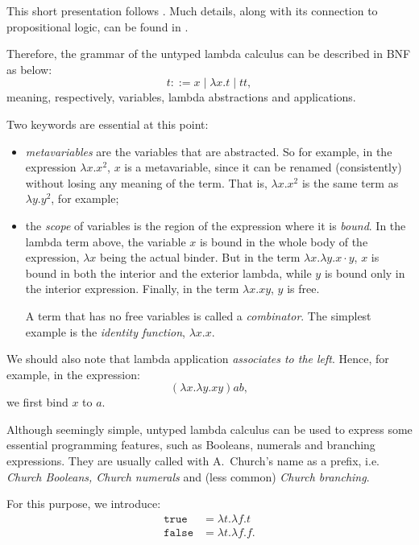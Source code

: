 This short presentation follows \cite[\S5]{tapl}. Much details, along
with its connection to propositional logic, can be found in
\cite{ch}.

Therefore, the grammar of the untyped lambda calculus can be described
in BNF as below:
\[
  t ::= x \mid \lambda x . t \mid t t,
\]
meaning, respectively, variables, lambda abstractions and applications.

Two keywords are essential at this point:
\begin{itemize}
\item \emph{metavariables} are the variables that are abstracted.
  So for example, in the expression $ \lambda x . x^2 $, $ x $ is
  a metavariable, since it can be renamed (consistently) without
  losing any meaning of the term. That is, $ \lambda x . x^2 $ is
  the same term as $ \lambda y . y^2 $, for example;
\item the \emph{scope} of variables is the region of the expression
  where it is \emph{bound}. In the lambda term above, the variable
  $ x $ is bound in the whole body of the expression, $ \lambda x $
  being the actual binder. But in the term
  $ \lambda x . \lambda y . x \cdot y $, $ x $ is bound
  in both the interior and the exterior lambda, while $ y $ is bound
  only in the interior expression. Finally, in the term
  $ \lambda x . xy $, $ y $ is free.

  A term that has no free variables is called a \emph{combinator}.
  The simplest example is the \emph{identity function},
  $ \lambda x . x $.
\end{itemize}

We should also note that lambda application \emph{associates to the left}.
Hence, for example, in the expression:
\[
  (\lambda x . \lambda y . xy)ab,
\]
we first bind $ x $ to $ a $.

Although seemingly simple, untyped lambda calculus can be used
to express some essential programming features, such as Booleans,
numerals and branching expressions. They are usually called with
A.\ Church's name as a prefix, i.e. \emph{Church Booleans, Church %
  numerals} and (less common) \emph{Church branching}.

For this purpose, we introduce:
\begin{align*}
  \texttt{true} &= \lambda t . \lambda f . t \\
  \texttt{false} &= \lambda t . \lambda f . f.
\end{align*}

